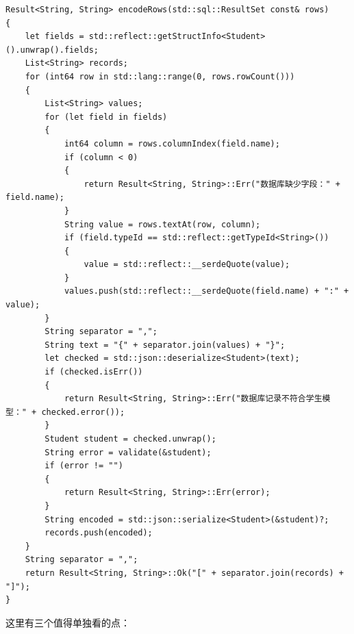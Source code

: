 \par
\medskip
\begin{lstlisting}[style=chali]
Result<String, String> encodeRows(std::sql::ResultSet const& rows)
{
    let fields = std::reflect::getStructInfo<Student>().unwrap().fields;
    List<String> records;
    for (int64 row in std::lang::range(0, rows.rowCount()))
    {
        List<String> values;
        for (let field in fields)
        {
            int64 column = rows.columnIndex(field.name);
            if (column < 0)
            {
                return Result<String, String>::Err("数据库缺少字段：" + field.name);
            }
            String value = rows.textAt(row, column);
            if (field.typeId == std::reflect::getTypeId<String>())
            {
                value = std::reflect::__serdeQuote(value);
            }
            values.push(std::reflect::__serdeQuote(field.name) + ":" + value);
        }
        String separator = ",";
        String text = "{" + separator.join(values) + "}";
        let checked = std::json::deserialize<Student>(text);
        if (checked.isErr())
        {
            return Result<String, String>::Err("数据库记录不符合学生模型：" + checked.error());
        }
        Student student = checked.unwrap();
        String error = validate(&student);
        if (error != "")
        {
            return Result<String, String>::Err(error);
        }
        String encoded = std::json::serialize<Student>(&student)?;
        records.push(encoded);
    }
    String separator = ",";
    return Result<String, String>::Ok("[" + separator.join(records) + "]");
}
\end{lstlisting}
\par
\medskip

这里有三个值得单独看的点：

